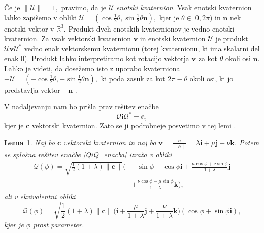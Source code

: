 \documentclass[12pt,a4paper,twoside]{article}
\theoremstyle{definition} %
\theoremstyle{plain} %
\newtheorem{lema}[definicija]{Lema}
\theoremstyle{primerstyle}
\numberwithin{equation}{section}  %
\newcommand{\R}{\mathbb R}
\newcommand{\cV}{\mathbf{c}}
\newcommand{\nV}{\mathbf{n}}
\newcommand{\iV}{\mathbf{i}}
\newcommand{\jV}{\mathbf{j}}
\newcommand{\kV}{\mathbf{k}}
\newcommand{\vV}{\mathbf{v}}
\newcommand{\QQ}{\mathcal{Q}}
\newcommand{\UQ}{\mathcal{U}}
\begin{document}
Če je $\lVert\UQ\rVert=1,$ pravimo, da je $\UQ$ \emph{enotski kvaternion}. Vsak enotski kvaternion lahko zapišemo v obliki $\UQ=(\cos\frac{1}{2}\theta,\sin\frac{1}{2}\theta\nV),$ kjer je $\theta\in[0,2\pi)$ in $\nV$ nek enotski vektor v $\R^3.$ Produkt dveh enotskih kvaternionov je vedno enotski kvaternion. Za vsak vektorski kvaternion $\vV$ in enotski kvaternion $\UQ$ je produkt $\UQ\vV\UQ^*$ vedno enak vektorskemu kvaternionu (torej kvaternionu, ki ima skalarni del enak 0). Produkt lahko interpretiramo kot rotacijo vektorja $\vV$ za kot $\theta$ okoli osi $\nV.$ Lahko je videti, da dosežemo isto z uporabo kvaterniona $-\UQ=(-\cos\frac{1}{2}\theta,-\sin\frac{1}{2}\theta\nV),$ ki poda zasuk za kot $2\pi-\theta$ okoli osi, ki jo predstavlja vektor $-\nV$ \cite[str. 387]{faroukietal2004}.

V nadaljevanju nam bo prišla prav rešitev enačbe
\begin{equation}
	\label{QiQ_enacba}
	\QQ\iV\QQ^*=\cV,
\end{equation}
kjer je $\cV$ vektorski kvaternion. Zato se ji podrobneje posvetimo v tej lemi \cite[poglavje 3.2]{farouki2002hermite}.
\begin{lema}
	\label{QiQ_enacba_lema}
	Naj bo $\cV$ vektorski kvaternion in naj bo $\vV=\frac{\cV}{\lVert\cV\rVert}=\lambda\iV+\mu\jV+\nu\kV$. Potem se splošna rešitev enačbe \eqref{QiQ_enacba} izraža v obliki
	\begin{align}
		\QQ(\phi)=\sqrt{\frac{1}{2}(1+\lambda)\lVert\cV\rVert}\Big(&-\sin\phi+\cos\phi\iV+\frac{\mu\cos\phi+\nu\sin\phi}{1+\lambda}\jV\nonumber\\
		&+\frac{\nu\cos\phi-\mu\sin\phi}{1+\lambda}\kV\Big),\label{QiQ_enacba_resitev}
	\end{align}
	ali v ekvivalentni obliki
	\begin{equation}
		\label{QiQ_enacba_resitev2}
		\QQ(\phi)=\sqrt{\frac{1}{2}(1+\lambda)\lVert\cV\rVert}\Big(\iV+\frac{\mu}{1+\lambda}\jV+\frac{\nu}{1+\lambda}\kV\Big)(\cos\phi+\sin\phi\iV),
	\end{equation}
	kjer je $\phi$ prost parameter.
\end{lema}
\end{document}
